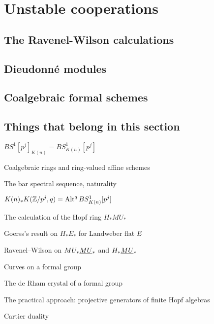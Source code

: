 
\chapter{Unstable cooperations}


\section{The Ravenel-Wilson calculations}

\section{Dieudonn\'e modules}

\section{Coalgebraic formal schemes}




\section*{Things that belong in this section}

$BS^1[p^j]_{K(n)} = BS^1_{K(n)}[p^j]$

Coalgebraic rings and ring-valued affine schemes

The bar spectral sequence, naturality

$K(n)_* K(\mathbb Z/p^j, q) = \operatorname{Alt}^q BS^1_{K(n)}[p^j]$

The calculation of the Hopf ring $H_* MU_*$

Goerss's result on $H_* E_*$ for Landweber flat $E$

Ravenel--Wilson on $MU_* \smash{\underline{MU}}_{*}$ and $H_* \smash{\underline{MU}}_{*}$

Curves on a formal group

The de Rham crystal of a formal group

The practical approach: projective generators of finite Hopf algebras

Cartier duality
